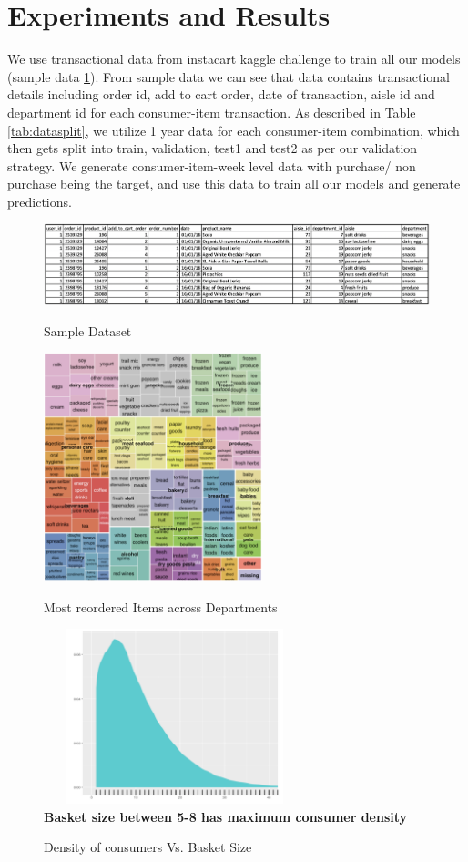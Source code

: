\section{Experiments and Results}
\label{sec:eval}
We use transactional data from instacart kaggle challenge to train all our models (sample data \ref{fig:sampledata}). From 
sample data we can see that data contains transactional details including
order id, add to cart order, date of transaction, aisle id and department id for each consumer-item transaction.
As described in Table \ref{tab:datasplit}, we utilize 1 year data for each consumer-item combination, 
which then gets split into train, validation, test1 and test2 as per our validation strategy. 
We generate consumer-item-week level data with purchase/ non purchase being the target,
and use this data to train all our models and generate predictions.
 \begin{figure}[!t]
    \centering 
    \caption{Sample Dataset} 
    \includegraphics[width=6.6in]{img/sampledata.png} 
    \label{fig:sampledata} 
  \end{figure}

  \begin{figure}[t]
    \centering 
    \caption{Most reordered Items across Departments} 
    \includegraphics[width=2.5in]{img/items.png} 
    \label{fig:items} 
  \end{figure}

  \begin{figure}[t]
    \centering 
    \caption{Density of consumers Vs. Basket Size} 
    \includegraphics[width=3in, height = 2in]{img/basket.png} 
    \\ {\scriptsize \bf Basket size between 5-8 has maximum consumer density}
    \label{fig:basket} 
  \end{figure}

